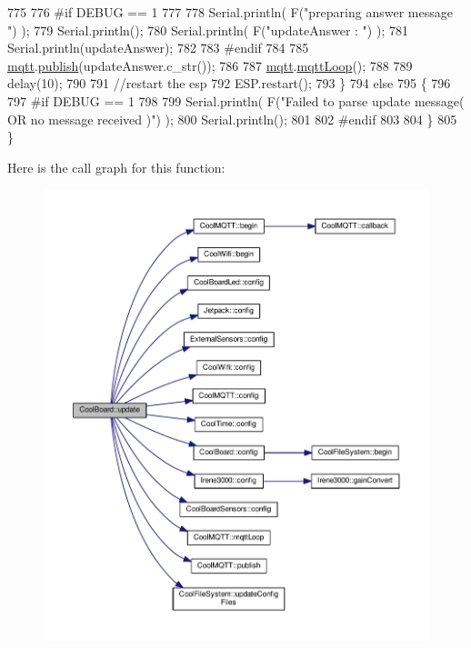 \begin{DoxyCode}
775 
776 \textcolor{preprocessor}{        #if DEBUG == 1}
777 
778             Serial.println( F(\textcolor{stringliteral}{"preparing answer message "}) );
779             Serial.println();
780             Serial.println( F(\textcolor{stringliteral}{"updateAnswer : "}) );
781             Serial.println(updateAnswer);
782         
783 \textcolor{preprocessor}{        #endif  }
784 
785             \hyperlink{classCoolBoard_a2399f44d7c23c1149a335cb3b46d90f1}{mqtt}.\hyperlink{classCoolMQTT_ace977b3e90ab14b1199fe5c4fb0a13ec}{publish}(updateAnswer.c\_str());
786             
787             \hyperlink{classCoolBoard_a2399f44d7c23c1149a335cb3b46d90f1}{mqtt}.\hyperlink{classCoolMQTT_aa5eaae967b562b62cbcf2b8d81f6e5d5}{mqttLoop}();
788 
789             delay(10);
790             
791             \textcolor{comment}{//restart the esp}
792             ESP.restart();
793     \}
794     \textcolor{keywordflow}{else}
795     \{
796     
797 \textcolor{preprocessor}{    #if DEBUG == 1}
798 
799         Serial.println( F(\textcolor{stringliteral}{"Failed to parse update message( OR no message received )"}) );
800         Serial.println();
801     
802 \textcolor{preprocessor}{    #endif}
803     
804     \}       
805 \}
\end{DoxyCode}
Here is the call graph for this function\+:
\nopagebreak
\begin{figure}[H]
\begin{center}
\leavevmode
\includegraphics[width=350pt]{classCoolBoard_a8612756d3f73198cdde857a66f0fe690_cgraph}
\end{center}
\end{figure}
